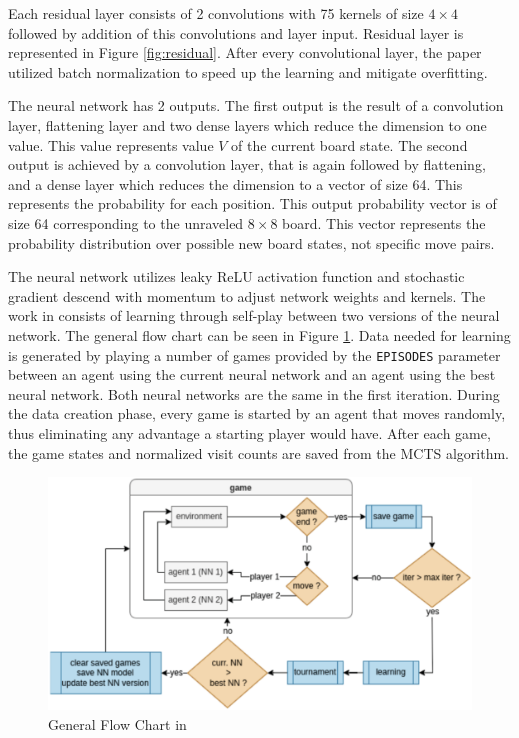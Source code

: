 Each residual layer consists of 2 convolutions with 75 kernels of size $4 \times 4$ followed by addition of this convolutions and layer input. Residual layer is represented in Figure \ref{fig:residual}. After every convolutional layer, the paper utilized batch normalization to speed up the learning and mitigate overfitting.

The neural network has 2 outputs. The first output is the result of a convolution layer, flattening layer and two dense layers which reduce the dimension to one value. This value represents value $V$ of the current board state. 
The second output is achieved by a convolution layer, that is again followed by flattening, and a dense layer which reduces the dimension to a vector of size 64. This represents the probability for each position. This output probability vector is of size 64 corresponding to the unraveled $8 \times 8$ board. This vector represents the probability distribution over possible new board states, not specific move pairs.

The neural network utilizes leaky ReLU activation function and stochastic gradient descend with momentum to adjust network weights and kernels. The work in \cite{Popic_Boskovic_Brest_2021} consists of learning through self-play between two versions of the neural network. The general flow chart can be seen in Figure \ref{fig:self-play}. Data needed for learning is generated by playing a number of games provided by the \verb!EPISODES! parameter between an agent using the current neural network and an agent using the best neural network. Both neural networks are the same in the first iteration. During the data creation phase, every game is started by an agent that moves randomly, thus eliminating any advantage a starting player would have. After each game, the game states and normalized visit counts are saved from the MCTS algorithm.

\begin{figure}[htb]
    \centering
    \includegraphics[width=0.7\linewidth]{images/self-play.png}
    \caption{General Flow Chart in \cite{Popic_Boskovic_Brest_2021}}
    \label{fig:self-play}
\end{figure}

